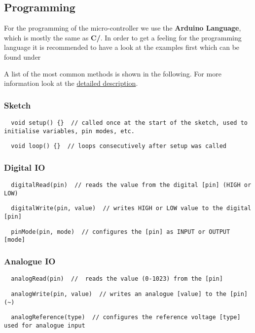 \subsection{Programming}\label{sec:prog}
For the programming of the micro-controller we use the \textbf{Arduino Language}, which is mostly the same as \textbf{C/\cpp}. In order to get a feeling for the programming language it is recommended to have a look at the examples first which can be found under \par
%
A list of the most common methods is shown in the following. For more information look at the \href{https://www.arduino.cc/reference/en/}{detailed description}.
%
\subsubsection*{Sketch}
\begin{verbatim}
  void setup() {}  // called once at the start of the sketch, used to initialise variables, pin modes, etc.
\end{verbatim}
\vspace*{-2ex}
\begin{verbatim}
  void loop() {}  // loops consecutively after setup was called
\end{verbatim}
\newpage
\subsubsection*{Digital \ac{IO}}
\begin{verbatim}
  digitalRead(pin)  // reads the value from the digital [pin] (HIGH or LOW)
\end{verbatim}
\vspace*{-2ex}
\begin{verbatim}
  digitalWrite(pin, value)  // writes HIGH or LOW value to the digital [pin]
\end{verbatim}
\vspace*{-2ex}
\begin{verbatim}
  pinMode(pin, mode)  // configures the [pin] as INPUT or OUTPUT [mode]
\end{verbatim}
\subsubsection*{Analogue \ac{IO}}
\begin{verbatim}
  analogRead(pin)  //  reads the value (0-1023) from the [pin]
\end{verbatim}
\vspace*{-2ex}
\begin{verbatim}
  analogWrite(pin, value)  // writes an analogue [value] to the [pin] (~)
\end{verbatim}
\vspace*{-2ex}
\begin{verbatim}
  analogReference(type)  // configures the reference voltage [type] used for analogue input
\end{verbatim}

